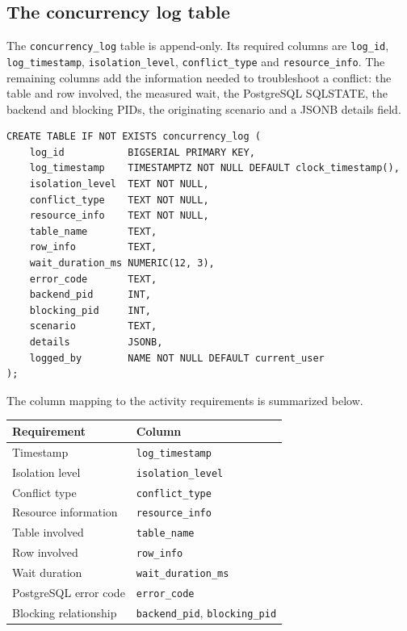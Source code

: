 \documentclass[11pt]{article}
\begin{document}
\subsection{The concurrency log table}

The \texttt{concurrency\_log} table is append-only. Its required columns are
\texttt{log\_id}, \texttt{log\_timestamp}, \texttt{isolation\_level},
\texttt{conflict\_type} and \texttt{resource\_info}. The remaining columns add
the information needed to troubleshoot a conflict: the table and row involved,
the measured wait, the PostgreSQL SQLSTATE, the backend and blocking PIDs, the
originating scenario and a JSONB details field.

\begin{verbatim}
CREATE TABLE IF NOT EXISTS concurrency_log (
    log_id           BIGSERIAL PRIMARY KEY,
    log_timestamp    TIMESTAMPTZ NOT NULL DEFAULT clock_timestamp(),
    isolation_level  TEXT NOT NULL,
    conflict_type    TEXT NOT NULL,
    resource_info    TEXT NOT NULL,
    table_name       TEXT,
    row_info         TEXT,
    wait_duration_ms NUMERIC(12, 3),
    error_code       TEXT,
    backend_pid      INT,
    blocking_pid     INT,
    scenario         TEXT,
    details          JSONB,
    logged_by        NAME NOT NULL DEFAULT current_user
);
\end{verbatim}

The column mapping to the activity requirements is summarized below.

\begin{center}
\begin{tabular}{ll}
\hline
Requirement & Column \\
\hline
Timestamp & \texttt{log\_timestamp} \\
Isolation level & \texttt{isolation\_level} \\
Conflict type & \texttt{conflict\_type} \\
Resource information & \texttt{resource\_info} \\
Table involved & \texttt{table\_name} \\
Row involved & \texttt{row\_info} \\
Wait duration & \texttt{wait\_duration\_ms} \\
PostgreSQL error code & \texttt{error\_code} \\
Blocking relationship & \texttt{backend\_pid}, \texttt{blocking\_pid} \\
\hline
\end{tabular}
\end{center}
\end{document}
